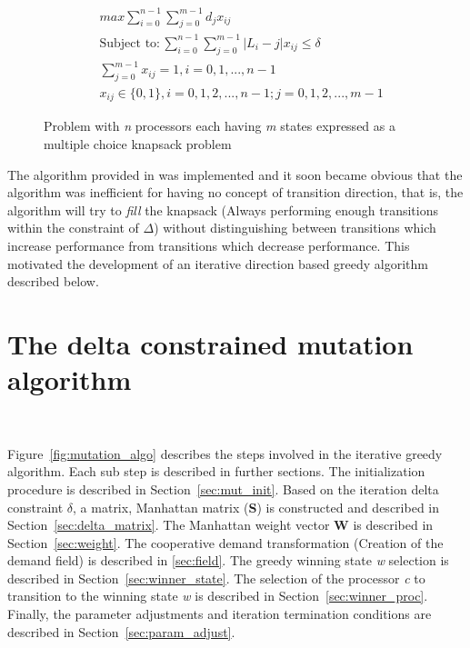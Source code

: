 \begin{figure}[h!]
\centering
\begin{align*}
    & max \displaystyle\sum_{i=0}^{n-1} \displaystyle\sum_{j=0}^{m-1} d_jx_{ij} \\
    & \text{Subject to} : \displaystyle\sum_{i=0}^{n-1} \displaystyle\sum_{j=0}^{m-1} |L_i - j| x_{ij} \leq \delta \\
    & \displaystyle\sum_{j=0}^{m-1} x_{ij} = 1 , i = 0, 1, ..., n-1 \\
    & x_{ij} \in \{0,1\} , i = 0,1,2,...,n-1 ; j = 0,1,2,...,m-1  
\end{align*}
\caption{Problem with \textit{n} processors each having \textit{m} states expressed as a multiple choice knapsack problem}
\label{fig:mckp}
\end{figure}

The algorithm provided in \cite{mckp} was implemented and it soon became obvious 
that the algorithm was inefficient for having no concept of transition direction,
that is, the algorithm will try to \textit{fill} the knapsack (Always performing
enough transitions within the constraint of $\Delta$) without distinguishing between
transitions which increase performance from transitions which decrease performance.
This motivated the development of an iterative direction based greedy algorithm described below.

\section{The delta constrained mutation algorithm}~\label{sec:delta_algo}

Figure~\ref{fig:mutation_algo} describes the steps involved in the iterative greedy algorithm. 
Each sub step is described in further sections. The initialization procedure is described in Section~\ref{sec:mut_init}.
Based on the iteration delta constraint $\delta$, a matrix, Manhattan
matrix (\textbf{S}) is constructed and described in Section~\ref{sec:delta_matrix}.
The Manhattan weight vector \textbf{W} is described in Section~\ref{sec:weight}.
The cooperative demand transformation (Creation of the demand field) is described in
\ref{sec:field}. The greedy winning state \textit{w} selection is described in Section~\ref{sec:winner_state}.
The selection of the processor \textit{c} to transition to the winning state \textit{w} 
is described in Section~\ref{sec:winner_proc}. Finally, the parameter adjustments and iteration
termination conditions are described in Section~\ref{sec:param_adjust}. 


